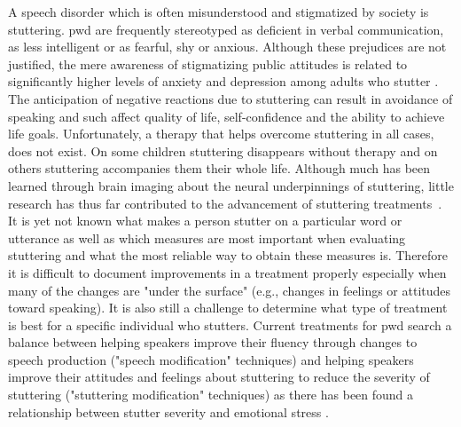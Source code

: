 A speech disorder which is often misunderstood and stigmatized by society is \gls{stuttering}. \gls{pwd} are frequently stereotyped as deficient in verbal communication, as less intelligent or as fearful, shy or anxious. Although these prejudices are not justified, the mere awareness of stigmatizing public attitudes is related to significantly higher levels of anxiety and depression among adults who stutter \cite{Boyle2016}. The anticipation of negative reactions due to stuttering can result in avoidance of speaking and such affect quality of life, self-confidence and the ability to achieve life goals. Unfortunately, a therapy that helps overcome stuttering in all cases, does not exist. On some children stuttering disappears without therapy and on others stuttering accompanies them their whole life. Although much has been learned through brain imaging about the neural underpinnings of stuttering, little research has thus far contributed to the advancement of stuttering treatments~\cite{Ingham2017}.
It is yet not known what makes a person stutter on a particular word or utterance as well as which measures are most important when evaluating stuttering and what the most reliable way to obtain these measures is. Therefore it is difficult to document improvements in a treatment properly especially when many of the changes are "under the surface" (e.g., changes in feelings or attitudes toward speaking). It is also still a challenge to determine what type of treatment is best for a specific individual who stutters. Current treatments for \gls{pwd} search a balance between helping speakers improve their fluency through changes to speech production ("speech modification" techniques) and helping speakers improve their attitudes and feelings about stuttering to reduce the severity of stuttering ("stuttering modification" techniques) as there has been found a relationship between stutter severity and emotional stress \cite{Choi2016,Smith2017,Vanryckeghem2001,Alm2015}. 

